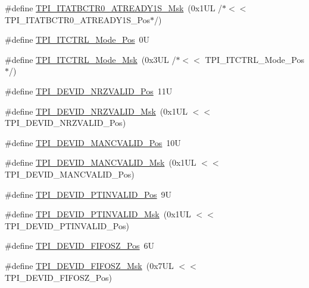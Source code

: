 \begin{DoxyCompactItemize}
\item 
\#define \hyperlink{group___c_m_s_i_s___t_p_i_ga6211d550c37ce45f9593ddf98d71f6eb}{T\+P\+I\+\_\+\+I\+T\+A\+T\+B\+C\+T\+R0\+\_\+\+A\+T\+R\+E\+A\+D\+Y1\+S\+\_\+\+Msk}~(0x1\+U\+L /$\ast$$<$$<$ T\+P\+I\+\_\+\+I\+T\+A\+T\+B\+C\+T\+R0\+\_\+\+A\+T\+R\+E\+A\+D\+Y1\+S\+\_\+\+Pos$\ast$/)
\item 
\#define \hyperlink{group___c_m_s_i_s___t_p_i_gaa847adb71a1bc811d2e3190528f495f0}{T\+P\+I\+\_\+\+I\+T\+C\+T\+R\+L\+\_\+\+Mode\+\_\+\+Pos}~0U
\item 
\#define \hyperlink{group___c_m_s_i_s___t_p_i_gad6f87550b468ad0920d5f405bfd3f017}{T\+P\+I\+\_\+\+I\+T\+C\+T\+R\+L\+\_\+\+Mode\+\_\+\+Msk}~(0x3\+U\+L /$\ast$$<$$<$ T\+P\+I\+\_\+\+I\+T\+C\+T\+R\+L\+\_\+\+Mode\+\_\+\+Pos$\ast$/)
\item 
\#define \hyperlink{group___c_m_s_i_s___t_p_i_ga9f46cf1a1708575f56d6b827766277f4}{T\+P\+I\+\_\+\+D\+E\+V\+I\+D\+\_\+\+N\+R\+Z\+V\+A\+L\+I\+D\+\_\+\+Pos}~11U
\item 
\#define \hyperlink{group___c_m_s_i_s___t_p_i_gacecc8710a8f6a23a7d1d4f5674daf02a}{T\+P\+I\+\_\+\+D\+E\+V\+I\+D\+\_\+\+N\+R\+Z\+V\+A\+L\+I\+D\+\_\+\+Msk}~(0x1\+U\+L $<$$<$ T\+P\+I\+\_\+\+D\+E\+V\+I\+D\+\_\+\+N\+R\+Z\+V\+A\+L\+I\+D\+\_\+\+Pos)
\item 
\#define \hyperlink{group___c_m_s_i_s___t_p_i_ga675534579d9e25477bb38970e3ef973c}{T\+P\+I\+\_\+\+D\+E\+V\+I\+D\+\_\+\+M\+A\+N\+C\+V\+A\+L\+I\+D\+\_\+\+Pos}~10U
\item 
\#define \hyperlink{group___c_m_s_i_s___t_p_i_ga4c3ee4b1a34ad1960a6b2d6e7e0ff942}{T\+P\+I\+\_\+\+D\+E\+V\+I\+D\+\_\+\+M\+A\+N\+C\+V\+A\+L\+I\+D\+\_\+\+Msk}~(0x1\+U\+L $<$$<$ T\+P\+I\+\_\+\+D\+E\+V\+I\+D\+\_\+\+M\+A\+N\+C\+V\+A\+L\+I\+D\+\_\+\+Pos)
\item 
\#define \hyperlink{group___c_m_s_i_s___t_p_i_ga974cccf4c958b4a45cb71c7b5de39b7b}{T\+P\+I\+\_\+\+D\+E\+V\+I\+D\+\_\+\+P\+T\+I\+N\+V\+A\+L\+I\+D\+\_\+\+Pos}~9U
\item 
\#define \hyperlink{group___c_m_s_i_s___t_p_i_ga1ca84d62243e475836bba02516ba6b97}{T\+P\+I\+\_\+\+D\+E\+V\+I\+D\+\_\+\+P\+T\+I\+N\+V\+A\+L\+I\+D\+\_\+\+Msk}~(0x1\+U\+L $<$$<$ T\+P\+I\+\_\+\+D\+E\+V\+I\+D\+\_\+\+P\+T\+I\+N\+V\+A\+L\+I\+D\+\_\+\+Pos)
\item 
\#define \hyperlink{group___c_m_s_i_s___t_p_i_ga3c7bb073c7ef96c2c3491c523fcb5bbe}{T\+P\+I\+\_\+\+D\+E\+V\+I\+D\+\_\+\+F\+I\+F\+O\+S\+Z\+\_\+\+Pos}~6U
\item 
\#define \hyperlink{group___c_m_s_i_s___t_p_i_gac7e718d8f239920d5b65e3eaa1c490df}{T\+P\+I\+\_\+\+D\+E\+V\+I\+D\+\_\+\+F\+I\+F\+O\+S\+Z\+\_\+\+Msk}~(0x7\+U\+L $<$$<$ T\+P\+I\+\_\+\+D\+E\+V\+I\+D\+\_\+\+F\+I\+F\+O\+S\+Z\+\_\+\+Pos)

\end{DoxyCompactItemize}
